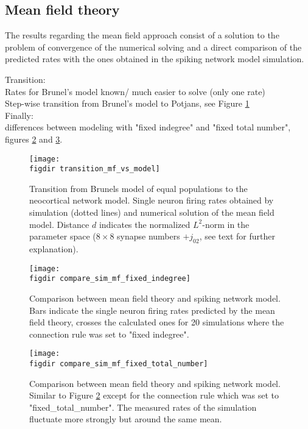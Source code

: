 \subsection{Mean field theory}
The results regarding the mean field approach consist of a solution to the problem 
of convergence of the numerical solving and a direct comparison of the predicted rates
with the ones obtained in the spiking network model simulation.

Transition: \\
Rates for Brunel's model known/ much easier to solve (only one rate) \\
Step-wise transition from Brunel's model to Potjans, see Figure \ref{fig:transition_mf_vs_model} \\
Finally: \\ 
differences between modeling with "fixed indegree" and "fixed total number",
figures \ref{fig:compare_sim_mf_fixed_indegree} and 
\ref{fig:compare_sim_mf_fixed_total_number}.
\begin{figure}[htpb]
    \centering
    \texttt{[image: \\figdir transition\_mf\_vs\_model]}
    \caption{Transition from Brunels model of equal populations to the neocortical network model. 
        Single neuron firing rates obtained by simulation (dotted lines) and 
        numerical solution of the mean field model. Distance $d$ indicates the 
        normalized $L^2$-norm in the parameter space ($8 \times 8$ synapse numbers $+ j_{02}$, see text
        for further explanation). 
    }
    \label{fig:transition_mf_vs_model}
\end{figure}
\begin{figure}[htpb]
    \centering
    \texttt{[image: \\figdir compare\_sim\_mf\_fixed\_indegree]}
    \caption{Comparison between mean field theory and spiking network model. 
        Bars indicate the single neuron firing rates predicted by the mean field 
        theory, crosses the calculated ones for 20 simulations where the connection
        rule was set to "fixed indegree".
    }
    \label{fig:compare_sim_mf_fixed_indegree}
\end{figure}
\begin{figure}[htpb]
    \centering
    \texttt{[image: \\figdir compare\_sim\_mf\_fixed\_total\_number]}
    \caption{Comparison between mean field theory and spiking network model.
        Similar to Figure \ref{fig:compare_sim_mf_fixed_indegree} except for the connection 
        rule which was set to "fixed\_total\_number". The measured rates of the simulation 
        fluctuate more strongly but around the same mean. 
    }
    \label{fig:compare_sim_mf_fixed_total_number}
\end{figure}

